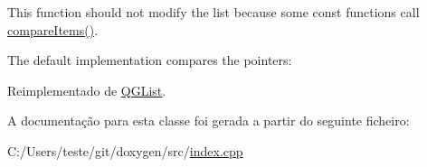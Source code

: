 This function should not modify the list because some const functions call \hyperlink{class_member_index_list_a219450accf048597ffc7113ecde4c402}{compare\-Items()}.

The default implementation compares the pointers\-: 
\begin{DoxyCode}
\end{DoxyCode}
 

Reimplementado de \hyperlink{class_q_g_list_aac689c6d7a54b6558afbd53845183af8}{Q\-G\-List}.



A documentação para esta classe foi gerada a partir do seguinte ficheiro\-:\begin{DoxyCompactItemize}
\item 
C\-:/\-Users/teste/git/doxygen/src/\hyperlink{index_8cpp}{index.\-cpp}\end{DoxyCompactItemize}
